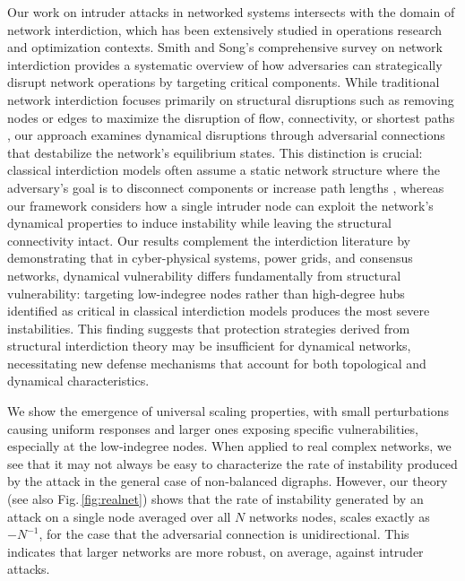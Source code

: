 \documentclass[%
 reprint,
 amsmath,amssymb,
 aip,
]{revtex4-2}
\theoremstyle{italichead}
\theoremstyle{definition}
\begin{document}
{ Our work on intruder attacks in networked systems intersects with the domain of network interdiction, which has been extensively studied in operations research and optimization contexts. Smith and Song's comprehensive survey on network interdiction \cite{smith2020survey} provides a systematic overview of how adversaries can strategically disrupt network operations by targeting critical components. While traditional network interdiction focuses primarily on structural disruptions such as removing nodes or edges to maximize the disruption of flow, connectivity, or shortest paths \cite{Wood1993,IsraeliWood2002}, our approach examines dynamical disruptions through adversarial connections that destabilize the network's equilibrium states. This distinction is crucial: classical interdiction models often assume a static network structure where the adversary's goal is to disconnect components or increase path lengths \cite{SmithSong2020,CappaneraScaparra2011}, whereas our framework considers how a single intruder node can exploit the network's dynamical properties to induce instability while leaving the structural connectivity intact. %
 Our results complement the interdiction literature by demonstrating that in cyber-physical systems, power grids, and consensus networks, dynamical vulnerability differs fundamentally from structural vulnerability: targeting low-indegree nodes rather than high-degree hubs identified as critical in classical interdiction models \cite{HolmeKimYoonHan2002} produces the most severe instabilities. This finding suggests that protection strategies derived from structural interdiction theory may be insufficient for dynamical networks, necessitating new defense mechanisms that account for both topological and dynamical characteristics.


We show the emergence of universal scaling properties, with small perturbations causing uniform responses and larger ones exposing specific vulnerabilities, especially at the low-indegree nodes.
When applied to real complex networks, we see that it may not always be easy to characterize the rate of instability produced by the attack in the general case of non-balanced digraphs. 
However, our theory (see also Fig.\,\ref{fig:realnet}) shows that the rate of instability generated by an attack on a single node averaged over all $N$ networks nodes, scales exactly as $-N^{-1}$,  for the case that the adversarial connection is unidirectional. This indicates that larger networks are more robust, on average, against intruder attacks.

}
\end{document}
